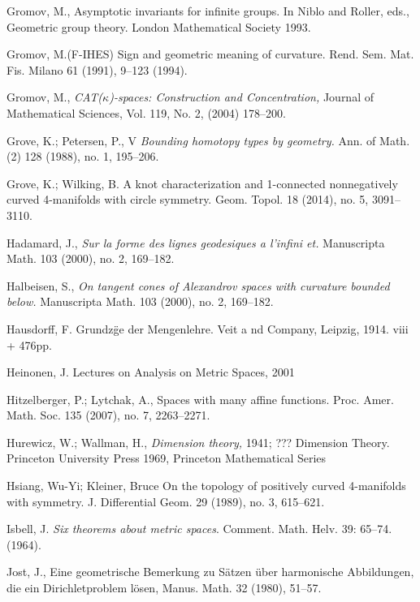 \begin{thebibliography}{52}
Gromov, M., Asymptotic invariants for infinite groups. 
In Niblo and Roller, eds.,
Geometric group theory. London Mathematical Society 1993.

Gromov, M.(F-IHES)
Sign and geometric meaning of curvature. 
Rend. Sem. Mat. Fis. Milano 61 (1991), 9--123 (1994). 

 Gromov, M., \textit{CAT($\kappa$)-spaces: Construction and Concentration,} Journal of Mathematical Sciences, Vol. 119, No. 2, (2004) 178--200.


 Grove, K.; Petersen, P., V
\textit{Bounding homotopy types by geometry.}
Ann. of Math. (2) 128 (1988), no. 1, 195--206.

 Grove, K.; Wilking, B.
A knot characterization and 1-connected nonnegatively curved 4-manifolds with circle symmetry. 
Geom. Topol. 18 (2014), no. 5, 3091--3110. 

 Hadamard, J., \textit{Sur la forme des lignes geodesiques a l'infini et.}  Manuscripta Math.  103  (2000),  no. 2, 169--182.

 Halbeisen, S., \textit{On tangent cones of Alexandrov spaces with curvature
bounded below.}  Manuscripta Math.  103  (2000),  no. 2, 169--182.

  Hausdorff, F. Grundz\"ge der Mengenlehre. Veit a nd  Company, Leipzig, 1914. viii + 476pp.

Heinonen, J.
Lectures on Analysis on Metric Spaces,
2001


Hitzelberger, P.; Lytchak, A.,
Spaces with many affine functions. 
Proc. Amer. Math. Soc. 135 (2007), no. 7, 2263--2271.


 Hurewicz, W.; Wallman, H., \textit{Dimension theory,} 1941;
???  Dimension Theory. Princeton University Press 1969,
       Princeton Mathematical Series
       
Hsiang, Wu-Yi; Kleiner, Bruce
On the topology of positively curved 4-manifolds with symmetry.
J. Differential Geom. 29 (1989), no. 3, 615--621. 

 Isbell, J. \textit{Six theorems about metric spaces}. Comment. Math. Helv. 39: 65--74.(1964).

 Jost, J.,
Eine geometrische Bemerkung zu S\"atzen \"uber
harmonische Abbildungen, die ein Dirichletproblem l\"osen,
Manus. Math. 32  (1980),  51--57.


\end{thebibliography}
